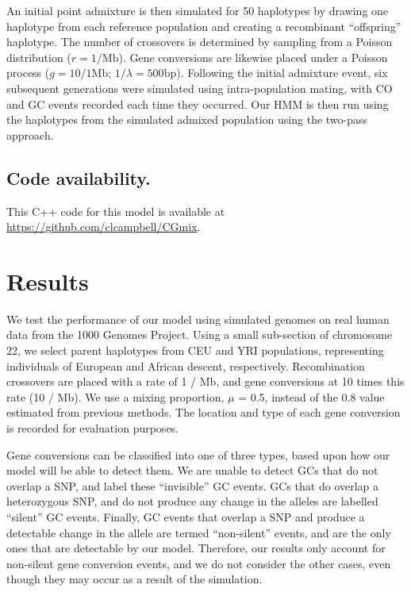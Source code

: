 An initial point admixture is then simulated for 50 haplotypes by drawing one haplotype from each reference population and creating a recombinant ``offspring'' haplotype.
The number of crossovers is determined by sampling from a Poisson distribution ($r = 1 / \mathrm{Mb}$).
Gene conversions are likewise placed under a Poisson process ($g = 10/1 \mathrm{Mb}$; $1/\lambda = 500 \mathrm{bp}$).
Following the initial admixture event, six subsequent generations were simulated using intra-population mating, with CO and GC events recorded each time they occurred. 
Our HMM is then run using the haplotypes from the simulated admixed population using the two-pass approach.

\subsection{Code availability.}
This C++ code for this model is available at \url{https://github.com/clcampbell/CGmix}.


\section{Results}


We test the performance of our model using simulated genomes on real human data from the 1000 Genomes Project\cite{1000G2015}.
Using a small sub-section of chromosome 22, we select parent haplotypes from CEU and YRI populations, representing individuals of European and African descent, respectively.
Recombination crossovers are placed with a rate of 1 / Mb, and gene conversions at 10 times this rate (10 / Mb).
We use a mixing proportion, $\mu$ = 0.5, instead of the 0.8 value estimated from previous methods\cite{Price2009}.
The location and type of each gene conversion is recorded for evaluation purposes.

Gene conversions can be classified into one of three types, based upon how our model will be able to detect them.
We are unable to detect GCs that do not overlap a SNP, and label these ``invisible'' GC events.
GCs that do overlap a heterozygous SNP, and do not produce any change in the alleles are labelled ``silent'' GC events.
Finally, GC events that overlap a SNP and produce a detectable change in the allele are termed ``non-silent'' events, and are the only ones that are detectable by our model.
Therefore, our results only account for non-silent gene conversion events, and we do not consider the other cases, even though they may occur as a result of the simulation.


